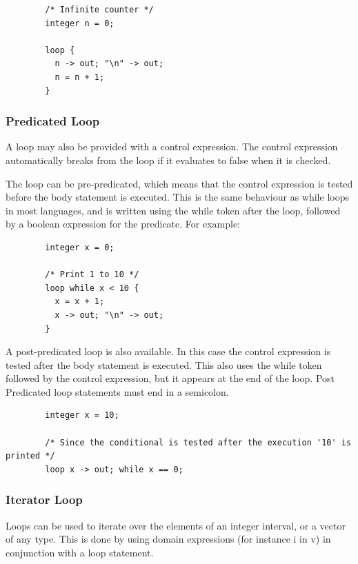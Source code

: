 \documentclass{article}
\begin{document}
      \begin{lstlisting}
        /* Infinite counter */
        integer n = 0;

        loop {
          n -> out; "\n" -> out;
          n = n + 1;
        }
      \end{lstlisting}

    \subsubsection{Predicated Loop}\label{sec:predicatedLoop}

      A loop may also be provided with a control expression. The control expression automatically breaks from the
      loop if it evaluates to false when it is checked.

      The loop can be pre-predicated, which means that the control expression is tested before the body statement
      is executed. This is the same behaviour as while loops in most languages, and is written using the while
      token after the loop, followed by a boolean expression for the predicate. For example:

      \begin{lstlisting}
        integer x = 0;

        /* Print 1 to 10 */
        loop while x < 10 {
          x = x + 1;
          x -> out; "\n" -> out;
        }
      \end{lstlisting}

      A post-predicated loop is also available. In this case the control expression is tested after the body
      statement is executed. This also uses the while token followed by the control expression, but it appears at
      the end of the loop. Post Predicated loop statements must end in a semicolon.

      \begin{lstlisting}
        integer x = 10;

        /* Since the conditional is tested after the execution '10' is printed */
        loop x -> out; while x == 0;
      \end{lstlisting}


    \subsubsection{Iterator Loop}\label{sec:iteratorLoop}

      Loops can be used to iterate over the elements of an integer interval, or a vector of any type. This is done
      by using domain expressions (for instance i in v) in conjunction with a loop statement.
\end{document}
